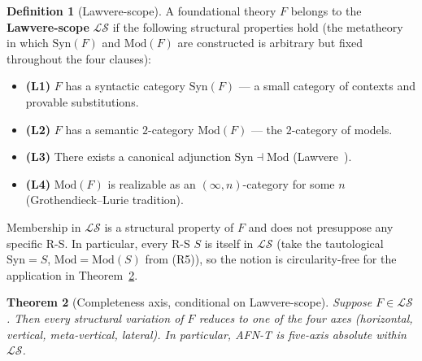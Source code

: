 \documentclass[11pt]{article}
\theoremstyle{plain}
\newtheorem{theorem}{Theorem}[section]
\theoremstyle{definition}
\newtheorem{definition}[theorem]{Definition}
\newcommand{\cS}{\mathcal{S}}
\newcommand{\cL}{\mathcal{L}}
\newcommand{\Syn}{\mathrm{Syn}}
\newcommand{\Mod}{\mathrm{Mod}}
\begin{document}
\begin{definition}[Lawvere-scope]\label{def:law-scope}
A foundational theory $F$ belongs to the \textbf{Lawvere-scope} $\cL\cS$ if the following structural properties hold (the metatheory in which $\Syn(F)$ and $\Mod(F)$ are constructed is arbitrary but fixed throughout the four clauses):
\begin{itemize}
\item \textbf{(L1)} $F$ has a syntactic category $\Syn(F)$ --- a small category of contexts and provable substitutions.
\item \textbf{(L2)} $F$ has a semantic $2$-category $\Mod(F)$ --- the $2$-category of models.
\item \textbf{(L3)} There exists a canonical adjunction $\Syn \dashv \Mod$ (Lawvere~\cite{Lawvere1969}).
\item \textbf{(L4)} $\Mod(F)$ is realizable as an $(\infty, n)$-category for some $n$ (Grothendieck--Lurie tradition).
\end{itemize}
Membership in $\cL\cS$ is a structural property of $F$ and does not presuppose any specific R-S. In particular, every R-S $S$ is itself in $\cL\cS$ (take the tautological $\Syn = S$, $\Mod = \Mod(S)$ from (R5)), so the notion is circularity-free for the application in Theorem~\ref{thm:completeness}.
\end{definition}

\begin{theorem}[Completeness axis, conditional on Lawvere-scope]\label{thm:completeness}
Suppose $F \in \cL\cS$. Then every structural variation of $F$ reduces to one of the four axes (horizontal, vertical, meta-vertical, lateral). In particular, AFN-T is five-axis absolute within $\cL\cS$.
\end{theorem}
\end{document}

